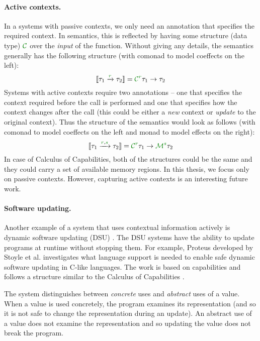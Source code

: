 \paragraph{Active contexts.}
In a systems with passive contexts, we only need an annotation that specifies the required 
context. In semantics, this is reflected by having some structure (data type) $\C$ over the
\emph{input} of the function. Without giving any details, the semantics generally has the 
following structure (with comonad to model coeffects on the left):
%
\begin{equation*}
\sem{\tau_1 \xrightarrow{\cclrd{r}} \tau_2} = \C^{\cclrd{r}} \tau_1 \rightarrow \tau_2
\end{equation*}
%
Systems with active contexts require two annotations -- one that specifies the context required
before the call is performed and one that specifies how the context changes after the call (this
could be either a \emph{new} context or \emph{update} to the original context). Thus the structure
of the semantics would look as follows (with comonad to model coeffects on the left and monad to 
model effects on the right):
%
\begin{equation*}
\sem{\tau_1 \xrightarrow{\cclrd{r}, \cclrd{s}} \tau_2} = \C^{\cclrd{r}} \tau_1 \rightarrow \M^{\cclrd{s}} \tau_2
\end{equation*}
%
In case of Calculus of Capabilities, both of the structures could be the same and they could
carry a set of available memory regions. In this thesis, we focus only on passive contexts. 
However, capturing active contexts is an interesting future work.


\paragraph{Software updating.}
Another example of a system that uses contextual information actively is dynamic software updating 
(DSU) \cite{app-dsu-programs,app-dsu}. The DSU systems have the ability to update programs at
runtime without stopping them. For example, Proteus developed by Stoyle et al. \cite{app-dsu-mutatis} 
investigates what language support is needed to enable safe dynamic software updating in C-like 
languages. The work is based on capabilities and follows a structure similar to the Calculus
of Capabilities \cite{app-capabilities}.

The system distinguishes between \emph{concrete} uses and \emph{abstract} uses of a value. When
a value is used concretely, the program examines its representation (and so it is not safe to
change the representation during an update). An abstract use of a value does not examine
the representation and so updating the value does not break the program.

